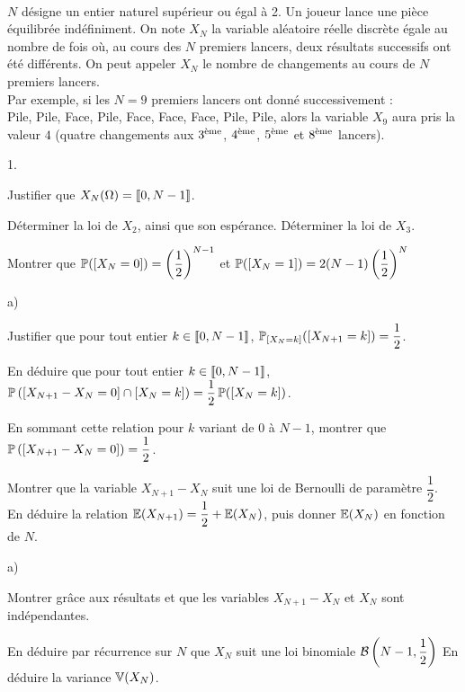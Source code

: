 \documentclass[11pt]{article}%
\begin{document}
\newpage


\begin{exercice}~\\
$N$ désigne un entier naturel supérieur ou égal à 2. Un joueur lance 
une pièce équilibrée indéfiniment. On note $X_N$ la variable 
aléatoire réelle discrète égale au nombre de fois où, au cours des 
$N$ premiers lancers, deux résultats successifs ont été différents. 
On peut appeler $X_N$ le \og nombre de changements \fg{} au cours de 
$N$ premiers lancers.\\
Par exemple, si les $N=9$ premiers lancers ont donné 
successivement :\\
Pile, Pile, Face, Pile, Face, Face, Face, Pile, Pile, alors la 
variable $X_9$ aura pris la valeur $4$ (quatre changements aux 
$\eme{3}$, $\eme{4}$, $\eme{5}$ et $\eme{8}$ lancers).
\begin{noliste}{1.}
  \item Justifier que $X_N(\Omega)=\llb 0,N-1 \rrb$.
  
  \item Déterminer la loi de $X_2$, ainsi que son espérance. 
  Déterminer la loi de $X_3$.
  
  \item Montrer que $\Prob(\Ev{X_N=0}) = \left(\dfrac{1}{2}
  \right)^{N-1}$ et $\Prob(\Ev{X_N=1}) = 2(N-1)\left(\dfrac{1}{2}
  \right)^N$
  
  \item
  \begin{noliste}{a)}
    \item Justifier que pour tout entier $k\in\llb 0,N-1 \rrb$, 
    $\Prob_{\Ev{X_N=k}}(\Ev{X_{N+1}=k})=\dfrac{1}{2}$.
    
    \item En déduire que pour tout entier $k\in\llb 0,N-1 \rrb$, $
    \Prob\left(\Ev{X_{N+1}-X_N=0} \cap \Ev{X_N=k}\right) = 
    \dfrac{1}{2} \, \Prob(\Ev{X_N=k})$.
    
    \item En sommant cette relation pour $k$ variant de $0$ à $N-1$, 
    montrer que $\Prob\left(\Ev{X_{N+1}-X_N = 0}\right) = 
    \dfrac{1}{2}$.
    
    \item Montrer que la variable $X_{N+1}-X_N$ suit une loi de 
    Bernoulli de paramètre $\dfrac{1}{2}$.\\
    En déduire la relation $\E(X_{N+1})=\dfrac{1}{2}+\E(X_N)$, puis 
    donner $\E(X_N)$ en fonction de $N$.
  \end{noliste}
  
  \item
  \begin{noliste}{a)}
    \item Montrer grâce aux résultats  et  que 
    les variables $X_{N+1}-X_N$ et $X_N$ sont indépendantes.
    
    \item En déduire par récurrence sur $N$ que $X_N$ suit une loi 
    binomiale $\Bin{N-1}{\dfrac{1}{2}}$ En déduire la variance $
    \V(X_N)$.
  \end{noliste}
\end{noliste}
\end{exercice}
\end{document}
